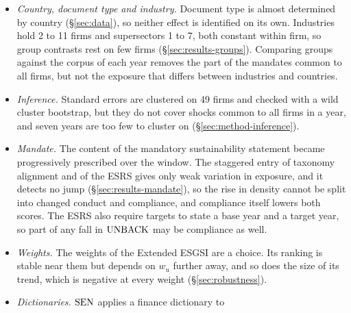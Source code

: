 \begin{itemize}
  of the extracted share is therefore selection rather than more disclosure:
  without the transversal entries, which hold the regime names, the share
  would rise from 30.2\,\% of a
  report in 2018 to 46.4\,\% in 2024, against 31.6\,\% and 49.6\,\%, so about
  a tenth of the rise. Text admitted this way reaches every component: the topic words
  of the ESRS lower $\SEN$ in 2024 (\S\ref{sec:results-time}), and the zero
  cells of the taxonomy templates would raise $\QUANT$ had they not been
  excluded (\S\ref{sec:method-index}). The checks bound this dependence
  without removing it: re-extracting without the transversal pillar keeps
  most of the text and a clearly negative trend, deleting the entries that
  qualify only on the later reports leaves the trend
  (\S\ref{sec:robustness}), and the share of classifier-labelled ESG text
  that the extraction misses shows no trend (\S\ref{sec:method-extraction}).
\item \emph{Country, document type and industry.} Document type is almost
  determined by country (\S\ref{sec:data}), so neither effect is identified
  on its own. Industries hold 2 to 11 firms and supersectors 1 to 7, both
  constant within firm, so group contrasts rest on few firms
  (\S\ref{sec:results-groups}). Comparing groups against the corpus of
  each year removes the part of the mandates common to all firms, but not
  the exposure that differs between industries and countries.
\item \emph{Inference.} Standard errors are clustered on 49 firms and checked
  with a wild cluster bootstrap, but they do not cover shocks common to all
  firms in a year, and seven years are too few to cluster on
  (\S\ref{sec:method-inference}).
\item \emph{Mandate.} The content of the mandatory sustainability statement
  became progressively prescribed over the window. The staggered entry of
  taxonomy alignment and of the ESRS gives only weak variation in exposure,
  and it detects no jump (\S\ref{sec:results-mandate}), so the rise in
  density cannot be split into changed conduct and compliance, and
  compliance itself lowers both scores. The ESRS also require targets to
  state a base year and a target year, so part of any fall in $\mathrm{UNBACK}$ may
  be compliance as well.
\item \emph{Weights.} The weights of the Extended ESGSI are a choice. Its
  ranking is stable near them but depends on $w_u$ further away, and so does
  the size of its trend, which is negative at every weight
  (\S\ref{sec:robustness}).
\item \emph{Dictionaries.} $\SEN$ applies a finance dictionary to

\end{itemize}
